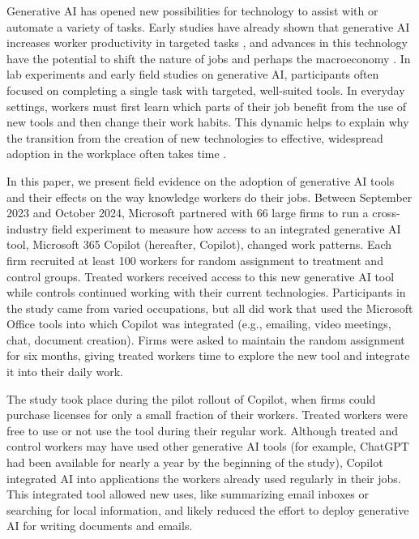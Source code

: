 \documentclass{article}
\begin{document}
Generative AI has opened new possibilities for technology to assist with or automate a variety of tasks.  Early studies have already shown that generative AI increases worker productivity in targeted tasks \citep[e.g.][]{brynjolfsson2023generative, peng2023impact,noy2023experimental, dell2023navigating}, and advances in this technology have the potential to shift the nature of jobs \citep{eloundou2024gpts, tomlinson2025working} and perhaps the macroeconomy \citep{autor2024applying,acemoglu2025simple}. In lab experiments and early field studies on generative AI, participants often focused on completing a single task with targeted, well-suited tools. In everyday settings, workers must first learn which parts of their job benefit from the use of new tools and then change their work habits. This dynamic helps to explain why the transition from the creation of new technologies to effective, widespread adoption in the workplace often takes time \citep{brynjolfsson2021productivity}.

In this paper, we present field evidence on the adoption of generative AI tools and their effects on the way knowledge workers do their jobs. Between September 2023 and October 2024, Microsoft partnered with 66 large firms to run a cross-industry field experiment to measure how access to an integrated generative AI tool, Microsoft 365 Copilot (hereafter, Copilot), changed work patterns. Each firm recruited at least 100 workers for random assignment to treatment and control groups. Treated workers received access to this new generative AI tool while controls continued working with their current technologies. Participants in the study came from varied occupations, but all did work that used the Microsoft Office tools into which Copilot was integrated (e.g., emailing, video meetings, chat, document creation). Firms were asked to maintain the random assignment for six months, giving treated workers time to explore the new tool and integrate it into their daily work.

The study took place during the pilot rollout of Copilot, when firms could purchase licenses for only a small fraction of their workers.  
Treated workers were free to use or not use the tool during their regular work. Although treated and control workers may have used other generative AI tools (for example, ChatGPT had been  available for nearly a year by the beginning of the study), Copilot integrated AI into applications the workers already used regularly in their jobs. This integrated tool allowed new uses, like summarizing email inboxes or searching for local information, and likely reduced the effort to deploy generative AI for writing documents and emails.
\end{document}
